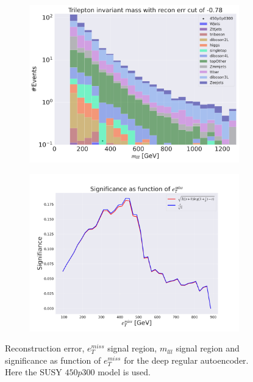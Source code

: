 \begin{figure}[H]
    \hfill
    \begin{subfigure}{.40\textwidth}
        \includegraphics[width=\textwidth]{Figures/AE_testing/big/3lep/b_data_recon_big_rm3_feats_sig_450p0p0300_mlll_recon_errcut_-0.78.pdf}
        \caption{}
        \label{fig:AE_3lep_big_mlll_450_3}
    \end{subfigure}
    \hfill   
    \begin{subfigure}{.40\textwidth}
        \includegraphics[width=\textwidth]{Figures/AE_testing/big/3lep/significance_etmiss_450p0p0300_-0.7824137709201433.pdf}
        \caption{}
        \label{fig:AE_3lep_big_signi_450_3}
    \end{subfigure}
    \hfill      
    \caption[3lep deep network | $450p300$ | AE | 3]{Reconstruction error, $e_T^{miss}$ signal region, $m_{lll}$ signal region and significance as function of 
    $e_T^{miss}$ for the deep regular autoencoder. Here the SUSY $450p300$ model is used.}
    \label{fig:AE_3lep_big_rec_sig_signi_450_3}
\end{figure}

